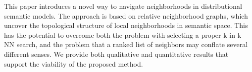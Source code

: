 This paper introduces a novel way to navigate neighborhoods in distributional semantic models. The approach is based on relative neighborhood graphs, which uncover the topological structure of local neighborhoods in semantic space. This has the potential to overcome both the problem with selecting a proper k in k-NN search, and the problem that a ranked list of neighbors may conflate several different senses. We provide both qualitative and quantitative results that support the viability of the proposed method.
